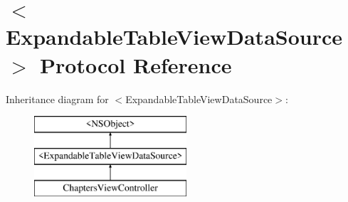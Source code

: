\hypertarget{protocol_expandable_table_view_data_source-p}{\section{$<$Expandable\-Table\-View\-Data\-Source$>$ Protocol Reference}
\label{protocol_expandable_table_view_data_source-p}
}
Inheritance diagram for $<$Expandable\-Table\-View\-Data\-Source$>$\-:\begin{figure}[H]
\begin{center}
\leavevmode
\includegraphics[height=3.000000cm]{protocol_expandable_table_view_data_source-p}
\end{center}
\end{figure}
